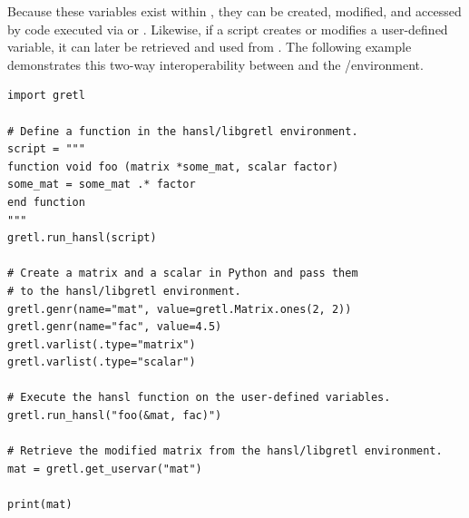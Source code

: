Because these variables exist within \lgretl, they can be
created, modified, and accessed by \hansl code executed via
 or . Likewise,
if a \hansl script creates or modifies a user-defined variable,
it can later be retrieved and used from \python. The following
example demonstrates this two-way interoperability between
\python and the \hansl/\lgretl environment.

\begin{lstlisting}[style=pythonstylefoot]
import gretl

# Define a function in the hansl/libgretl environment.
script = """
function void foo (matrix *some_mat, scalar factor)
some_mat = some_mat .* factor
end function
"""
gretl.run_hansl(script)

# Create a matrix and a scalar in Python and pass them
# to the hansl/libgretl environment.
gretl.genr(name="mat", value=gretl.Matrix.ones(2, 2))
gretl.genr(name="fac", value=4.5)
gretl.varlist(.type="matrix")
gretl.varlist(.type="scalar")

# Execute the hansl function on the user-defined variables.
gretl.run_hansl("foo(&mat, fac)")

# Retrieve the modified matrix from the hansl/libgretl environment.
mat = gretl.get_uservar("mat")

print(mat)
\end{lstlisting}
